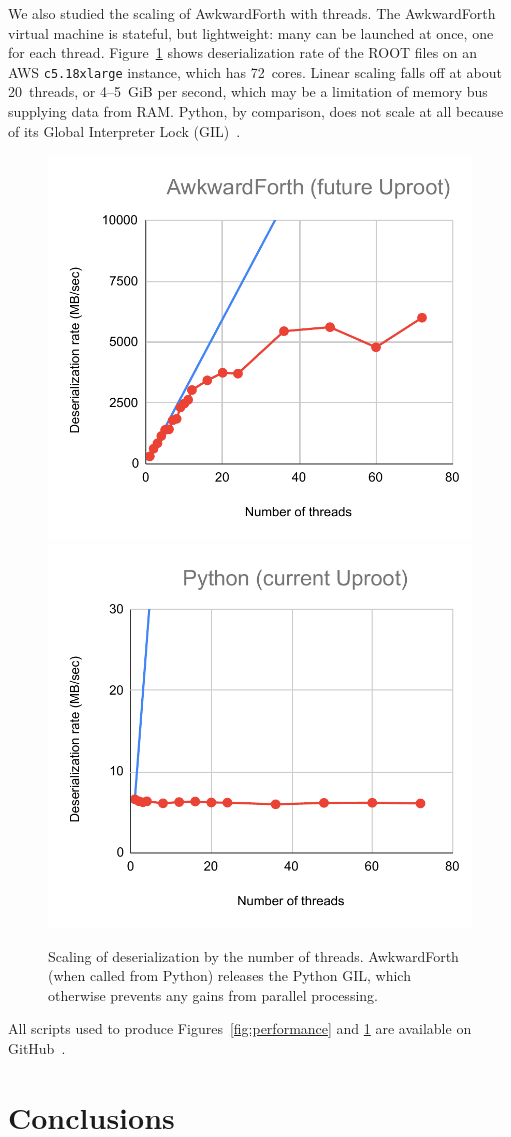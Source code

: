\documentclass{webofc}
\begin{document}
We also studied the scaling of AwkwardForth with threads. The AwkwardForth virtual machine is stateful, but lightweight: many can be launched at once, one for each thread. Figure~\ref{fig:scaling} shows deserialization rate of the ROOT files on an AWS {\tt c5.18xlarge} instance, which has 72~cores. Linear scaling falls off at about 20~threads, or 4--5~GiB per second, which may be a limitation of memory bus supplying data from RAM. Python, by comparison, does not scale at all because of its Global Interpreter Lock (GIL)~\cite{python-gil}.

\begin{figure}[t]
\includegraphics[width=0.5\linewidth]{AwkwardForth-scaling.pdf}
\includegraphics[width=0.5\linewidth]{Python-scaling.pdf}

\caption{Scaling of deserialization by the number of threads. AwkwardForth (when called from Python) releases the Python GIL, which otherwise prevents any gains from parallel processing. \label{fig:scaling}}
\end{figure}

All scripts used to produce Figures~\ref{fig:performance} and \ref{fig:scaling} are available on GitHub~\cite{this-study}.

\section{Conclusions}
\end{document}
